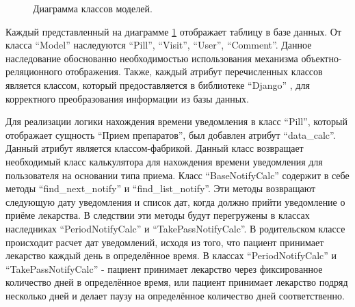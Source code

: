         \begin{landscape}
            \begin{figure}[H]%
                \centering
                \caption{Диаграмма классов моделей.} \label{class-diagram-models}
            \end{figure} 
        \end{landscape}

        Каждый представленный на диаграмме \ref{class-diagram-models}  отображает таблицу в %
        базе данных. От класса “Model” наследуются “Pill”, “Visit”, “User”, “Comment”. %
        Данное наследование обоснованно необходимостью использования механизма объектно-реляционного %
        отображения. Также, каждый атрибут перечисленных классов является классом, %
        который предоставляется в библиотеке “Django” \cite{django}, для корректного %
        преобразования информации из базы данных.

        Для реализации логики нахождения времени уведомления в класс “Pill”, который %
        отображает сущность “Прием препаратов”, был добавлен атрибут “data\_calc”. %
        Данный атрибут является классом-фабрикой. Данный класс возвращает необходимый %
        класс калькулятора для нахождения времени уведомления для пользователя на %
        основании типа приема. Класс “BaseNotifyCalc” содержит в себе методы %
        “find\_next\_notify” и “find\_list\_notify”. Эти методы возвращают следующую дату %
        уведомления и список дат, когда должно прийти уведомление о приёме лекарства. В %
        следствии эти методы будут перегружены в классах наследниках “PeriodNotifyCalc” и %
        “TakePassNotifyCalc”. В родительском классе происходит расчет дат уведомлений, исходя %
        из того, что пациент принимает лекарство каждый день в определённое время. В классах %
        “PeriodNotifyCalc” и “TakePassNotifyCalc” - пациент принимает лекарство через %
        фиксированное количество дней в определённое время, или пациент принимает лекарство %
        подряд несколько дней и делает паузу на определённое количество дней соответственно. 
        
